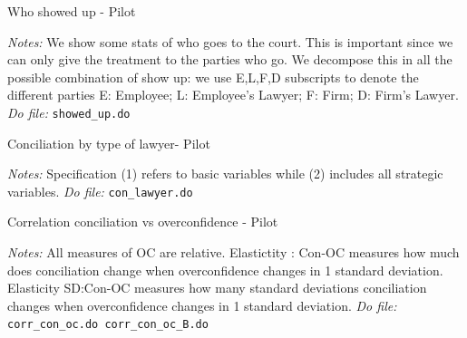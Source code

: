\documentclass[11pt]{article}
\begin{document}
\begin{table}[H]
    \caption{Who showed up - Pilot}
    \label{whoshowedup}
    \begin{center}
        \scriptsize{}
    \end{center}
    \footnotesize
    \textit{Notes:} 
We show some stats of who goes to the court. This is important since we can only give the treatment to the parties who go.  We decompose this in all the possible combination of show up: we use E,L,F,D subscripts to denote the different parties E: Employee; L: Employee’s Lawyer;  F: Firm; D: Firm’s Lawyer.
    \textit{Do file: } \texttt{showed\_up.do}
\end{table}







\begin{table}[H]
    \caption{Conciliation by type of lawyer- Pilot}
    \label{tab:reg_con_oc}
    \begin{center}
        \scriptsize{}
    \end{center}
    \footnotesize
    \textit{Notes:} 
   Specification (1) refers to basic variables while (2) includes all strategic variables.
    \textit{Do file: } \texttt{con\_lawyer.do}
\end{table} 

\begin{landscape}




\end{landscape}


\begin{table}[H]
    \caption{Correlation conciliation vs overconfidence - Pilot}
    \label{Table_concvsoc}
    \begin{center}
        \scriptsize{}
    \end{center}
    \footnotesize
    \textit{Notes:} 
    All measures of OC are relative. Elastictity : Con-OC measures how much does conciliation change when overconfidence changes in 1 standard deviation. Elasticity SD:Con-OC measures how many standard deviations conciliation changes when  overconfidence changes in 1 standard deviation.
    \textit{Do file: } \texttt{corr\_con\_oc.do corr\_con\_oc\_B.do}
\end{table}
\end{document}
